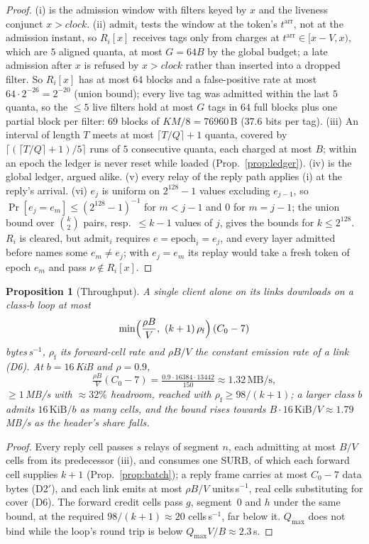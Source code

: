 \documentclass[journal]{IEEEtran}
\newtheorem{proposition}{Proposition}
\newcommand{\arr}{t^{\mathrm{arr}}}
\begin{document}
\begin{proof}
(i) is the admission window with filters keyed by $x$ and the liveness
conjunct $x>\mathit{clock}$.  (ii) $\mathrm{admit}_i$ tests the window at
the token's $\arr$, not at the admission instant, so $R_i[x]$
receives tags only from charges at $\arr\in[x-V,x)$, which are $5$ aligned
quanta, at most $G=64B$ by the global budget; a late admission after $x$
is refused by $x>\mathit{clock}$ rather than inserted into a dropped
filter.  So $R_i[x]$ has at most $64$ blocks
and a false-positive rate at most $64\cdot2^{-26}=2^{-20}$ (union bound);
every live tag was admitted within the last $5$ quanta, so the $\le5$
live filters hold at most $G$ tags in $64$ full blocks plus one partial
block per filter: $69$ blocks of $KM/8=76960$\,B ($37.6$ bits per tag).
(iii) An interval of length $T$ meets at most $\lceil T/Q\rceil+1$
quanta, covered by $\lceil(\lceil T/Q\rceil+1)/5\rceil$ runs of $5$
consecutive quanta, each charged at most $B$; within an epoch the ledger
is never reset while loaded (Prop.~\ref{prop:ledger}).  (iv) is the global
ledger, argued alike.  (v) every relay of the reply path applies (i) at the reply's
arrival.  (vi) $e_j$ is uniform on $2^{128}-1$ values excluding
$e_{j-1}$, so $\Pr[e_j=e_m]\le(2^{128}-1)^{-1}$ for $m<j-1$ and $0$ for
$m=j-1$; the union bound over $\binom k2$ pairs, resp.\ $\le k-1$ values
of $j$, gives the bounds for $k\le2^{128}$.  $R_i$ is cleared, but
$\mathrm{admit}_i$ requires $e=\mathrm{epoch}_i=e_j$, and every layer
admitted before names some $e_m\ne e_j$; with $e_j=e_m$ its replay would
take a fresh token of epoch $e_m$ and pass $\nu\notin R_i[x]$.
\end{proof}

\begin{proposition}[Throughput]\label{prop:rate}
A single client alone on its links downloads on a class-$b$ loop at most
\[
\min\Bigl(\frac{\rho B}{V},\ (k+1)\,\rho_{\mathrm{f}}\Bigr)\,(C_0-7)
\]
bytes\,s$^{-1}$, $\rho_{\mathrm{f}}$ its forward-cell rate and $\rho B/V$
the constant emission rate of a link (D6).  At $b=16$\,KiB and $\rho=0.9$,
\[
\tfrac{\rho B}{V}(C_0-7)=\tfrac{0.9\cdot16384\cdot13442}{150}\approx1.32\,\mathrm{MB/s},
\]
$\ge1$\,MB/s with $\approx32\%$ headroom, reached with $\rho_{\mathrm{f}}\ge98/(k+1)$; a
larger class $b$ admits $16\,\mathrm{KiB}/b$ as many cells, and the bound
rises towards $B\cdot16\,\mathrm{KiB}/V\approx1.79$\,MB/s as the header's
share falls.
\end{proposition}
\begin{proof}
Every reply cell passes $s$ relays of segment $n$, each admitting at most
$B/V$ cells from its predecessor (iii), and consumes one SURB, of which
each forward cell supplies $k+1$ (Prop.~\ref{prop:batch}); a reply frame
carries at most $C_0-7$ data bytes (D2$'$), and each link emits at most
$\rho B/V$ units\,s$^{-1}$, real cells substituting for cover (D6).  The
forward credit cells pass $g$, segment~$0$ and $h$ under the same bound, at
the required $98/(k+1)\approx20$ cells\,s$^{-1}$, far below it.  $Q_{\max}$
does not bind while the loop's round trip is below $Q_{\max}V/B\approx2.3$\,s.
\end{proof}
\end{document}
